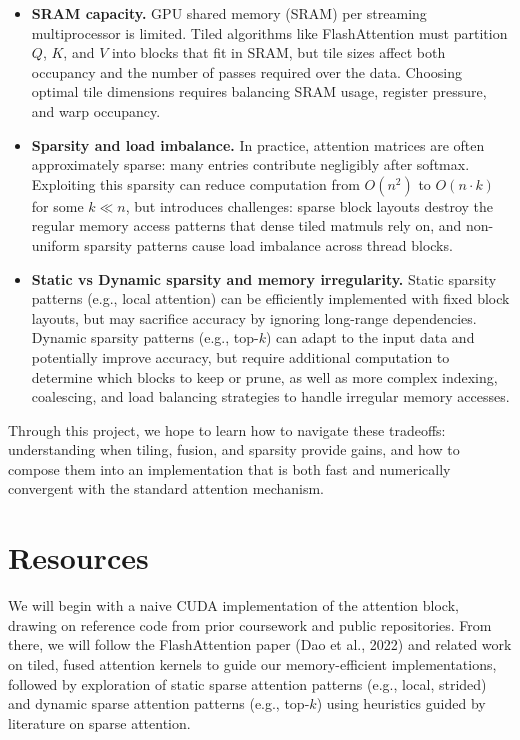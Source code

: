 \documentclass[11pt]{article}
\begin{document}
\begin{itemize}
    \item \textbf{SRAM capacity.} GPU shared memory (SRAM) per streaming multiprocessor is limited. Tiled algorithms like FlashAttention must partition $Q$, $K$, and $V$ into blocks that fit in SRAM, but tile sizes affect both occupancy and the number of passes required over the data. Choosing optimal tile dimensions requires balancing SRAM usage, register pressure, and warp occupancy.

    \item \textbf{Sparsity and load imbalance.} In practice, attention matrices are often approximately sparse: many entries contribute negligibly after softmax. Exploiting this sparsity can reduce computation from $O(n^2)$ to $O(n \cdot k)$ for some $k \ll n$, but introduces challenges: sparse block layouts destroy the regular memory access patterns that dense tiled matmuls rely on, and non-uniform sparsity patterns cause load imbalance across thread blocks. 
    
    \item \textbf{Static vs Dynamic sparsity and memory irregularity.} Static sparsity patterns (e.g., local attention) can be efficiently implemented with fixed block layouts, but may sacrifice accuracy by ignoring long-range dependencies. Dynamic sparsity patterns (e.g., top-$k$) can adapt to the input data and potentially improve accuracy, but require additional computation to determine which blocks to keep or prune, as well as more complex indexing, coalescing, and load balancing strategies to handle irregular memory accesses.

\end{itemize}

Through this project, we hope to learn how to navigate these tradeoffs: understanding when tiling, fusion, and sparsity provide gains, and how to compose them into an implementation that is both fast and numerically convergent with the standard attention mechanism.


\section*{Resources}
We will begin with a naive CUDA implementation of the attention block, drawing on reference code from prior coursework and public repositories. From there, we will follow the FlashAttention paper (Dao et al., 2022) and related work on tiled, fused attention kernels to guide our memory-efficient implementations, followed by exploration of static sparse attention patterns (e.g., local, strided) and dynamic sparse attention patterns (e.g., top-$k$) using heuristics guided by literature on sparse attention.
\end{document}
